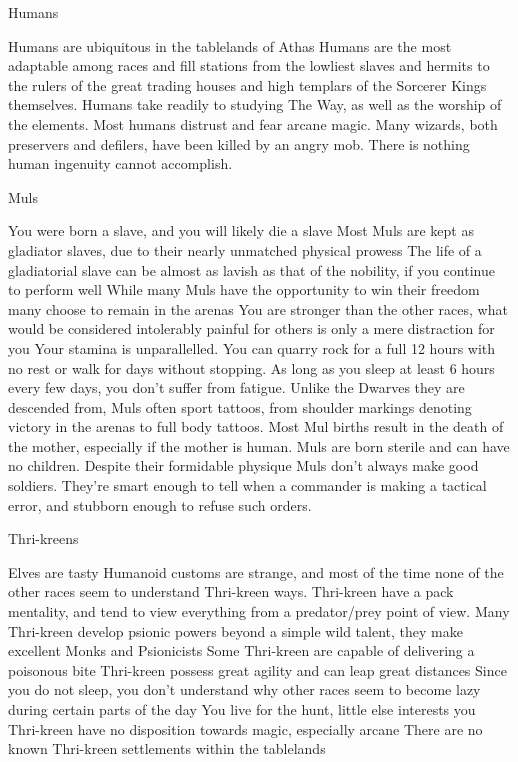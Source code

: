 Humans

    Humans are ubiquitous in the tablelands of Athas
    Humans are the most adaptable among races and fill stations from the lowliest slaves and hermits to the rulers of the great trading houses and high templars of the Sorcerer Kings themselves.
    Humans take readily to studying The Way, as well as the worship of the elements.
    Most humans distrust and fear arcane magic. Many wizards, both preservers and defilers, have been killed by an angry mob.
    There is nothing human ingenuity cannot accomplish.

Muls

    You were born a slave, and you will likely die a slave
    Most Muls are kept as gladiator slaves, due to their nearly unmatched physical prowess
    The life of a gladiatorial slave can be almost as lavish as that of the nobility, if you continue to perform well
    While many Muls have the opportunity to win their freedom many choose to remain in the arenas
    You are stronger than the other races, what would be considered intolerably painful for others is only a mere distraction for you
    Your stamina is unparallelled. You can quarry rock for a full 12 hours with no rest or walk for days without stopping. As long as you sleep at least 6 hours every few days, you don’t suffer from fatigue.
    Unlike the Dwarves they are descended from, Muls often sport tattoos, from shoulder markings denoting victory in the arenas to full body tattoos.
    Most Mul births result in the death of the mother, especially if the mother is human.
    Muls are born sterile and can have no children.
    Despite their formidable physique Muls don’t always make good soldiers. They’re smart enough to tell when a commander is making a tactical error, and stubborn enough to refuse such orders.

Thri-kreens

    Elves are tasty
    Humanoid customs are strange, and most of the time none of the other races seem to understand Thri-kreen ways.
    Thri-kreen have a pack mentality, and tend to view everything from a predator/prey point of view.
    Many Thri-kreen develop psionic powers beyond a simple wild talent, they make excellent Monks and Psionicists
    Some Thri-kreen are capable of delivering a poisonous bite
    Thri-kreen possess great agility and can leap great distances
    Since you do not sleep, you don’t understand why other races seem to become lazy during certain parts of the day
    You live for the hunt, little else interests you
    Thri-kreen have no disposition towards magic, especially arcane
    There are no known Thri-kreen settlements within the tablelands

